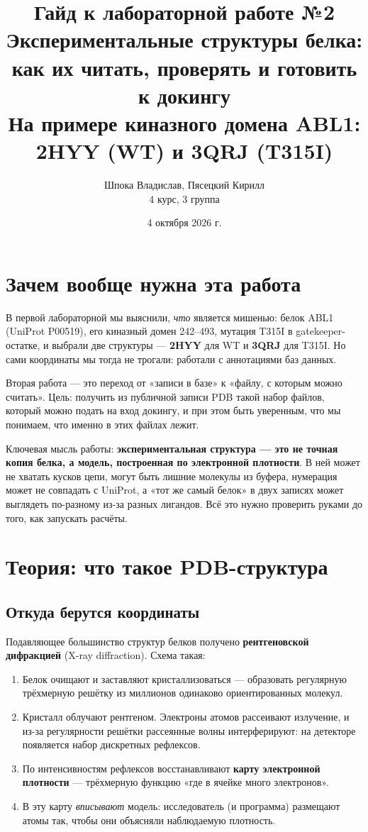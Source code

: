 \documentclass[12pt,a4paper]{article}
\title{\textbf{Гайд к лабораторной работе №2}\\[4pt]
Экспериментальные структуры белка: как их читать, проверять и готовить к докингу\\[4pt]
\large На примере киназного домена ABL1: 2HYY (WT) и 3QRJ (T315I)}
\author{Шпока Владислав, Пясецкий Кирилл\\4 курс, 3 группа}
\date{4 октября 2026 г.}
\newcommand{\code}[1]{{\ttfamily #1}}
\begin{document}
\maketitle
\tableofcontents
\newpage

\section{Зачем вообще нужна эта работа}

В первой лабораторной мы выяснили, \emph{что} является мишенью: белок ABL1
(UniProt \code{P00519}), его киназный домен 242--493, мутация T315I в
gatekeeper-остатке, и выбрали две структуры --- \textbf{2HYY} для WT и
\textbf{3QRJ} для T315I. Но сами координаты мы тогда не трогали: работали с
аннотациями баз данных.

Вторая работа --- это переход от «записи в базе» к «файлу, с которым можно
считать». Цель: получить из публичной записи PDB такой набор файлов, который
можно подать на вход докингу, и при этом быть уверенным, что мы понимаем, что
именно в этих файлах лежит.

Ключевая мысль работы: \textbf{экспериментальная структура --- это не точная копия
белка, а модель, построенная по электронной плотности}. В ней может не хватать
кусков цепи, могут быть лишние молекулы из буфера, нумерация может не совпадать с
UniProt, а «тот же самый белок» в двух записях может выглядеть по-разному из-за
разных лигандов. Всё это нужно проверить руками до того, как запускать расчёты.

\section{Теория: что такое PDB-структура}

\subsection{Откуда берутся координаты}

Подавляющее большинство структур белков получено \textbf{рентгеновской
дифракцией} (X-ray diffraction). Схема такая:

\begin{enumerate}[leftmargin=*,topsep=2pt,itemsep=3pt]
\item Белок очищают и заставляют кристаллизоваться --- образовать регулярную
трёхмерную решётку из миллионов одинаково ориентированных молекул.
\item Кристалл облучают рентгеном. Электроны атомов рассеивают излучение, и из-за
регулярности решётки рассеянные волны интерферируют: на детекторе появляется набор
дискретных рефлексов.
\item По интенсивностям рефлексов восстанавливают \textbf{карту электронной
плотности} --- трёхмерную функцию «где в ячейке много электронов».
\item В эту карту \emph{вписывают} модель: исследователь (и программа) размещают
атомы так, чтобы они объясняли наблюдаемую плотность.
\end{enumerate}
\end{document}
